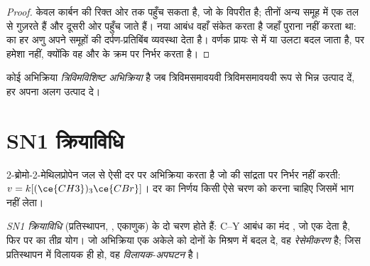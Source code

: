 \begin{proof}
 केवल कार्बन की रिक्त ओर तक पहुँच सकता है, जो
 के विपरीत है; तीनों अन्य समूह  में एक तल से
गुज़रते हैं और दूसरी ओर पहुँच जाते हैं। नया आबंध वहाँ संकेत करता है जहाँ
पुराना नहीं करता था:  का हर अणु अपने समूहों की दर्पण-प्रतिबिंब
व्यवस्था देता है। वर्णक प्रायः  से  में या उलटा बदल जाता है,
पर हमेशा नहीं, क्योंकि वह  और  के क्रम पर
निर्भर करता है।
\end{proof}

\begin{definition}[त्रिविमविशिष्ट अभिक्रिया]\label{def:b1:nucleophilic-substitution:stereospecific}
कोई अभिक्रिया \emph{त्रिविमविशिष्ट अभिक्रिया}
है जब त्रिविमसमावयवी  त्रिविमसमावयवी रूप से
भिन्न उत्पाद दें, हर  अपना अलग उत्पाद दे।
\end{definition}

\section{SN1 क्रियाविधि}

2-ब्रोमो-2-मेथिलप्रोपेन जल से ऐसी दर पर अभिक्रिया करता है जो
 की सांद्रता पर निर्भर नहीं करती: $v = k[(\ce{CH3})_3\ce{CBr}]$।
दर का निर्णय किसी ऐसे चरण को करना चाहिए जिसमें  भाग नहीं लेता।

\begin{definition}\label{def:b1:nucleophilic-substitution:sn1}
\emph{SN1 क्रियाविधि} (प्रतिस्थापन,
, एकाणुक) के दो चरण होते हैं: C--Y आबंध का मंद ,
जो एक  देता है, फिर  पर  का
तीव्र योग। जो अभिक्रिया एक अकेले
 को दोनों के मिश्रण में बदल दे, वह \emph{रेसेमीकरण} है;
जिस प्रतिस्थापन में विलायक ही  हो, वह
\emph{विलायक-अपघटन} है।
\end{definition}


